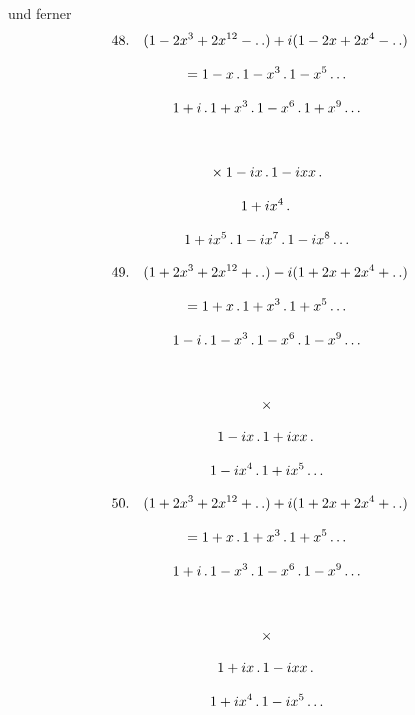 \begingroup
\renewcommand{\arraystretch}{1.45}
\par {}



und ferner
\[
\begin{gathered}
48.\quad{}
(1-2x^3+2x^{12}- .\,. )+i(1-2x+2x^4- .\,. )\\[8pt]
\quad=1-x\,.\,1-x^3\,.\,1-x^5\mathinner{.\,.\,.} \\[8pt]\quad{}1+i\,.\,1+x^3\,.\,1-x^6\,.\,1+x^9\mathinner{.\,.\,.}\\[8pt]
\qquad\\[8pt]\quad{}\times1-ix\,.\,1-ixx\,.\,\\[8pt]\quad{}1+ix^4\,.\,\\[8pt]\quad{}1+ix^5\,.\,1-ix^7\,.\,1-ix^8\mathinner{.\,.\,.}
\end{gathered}
\]

\[
\begin{gathered}
49.\quad{}
(1+2x^3+2x^{12}+ .\,. )-i(1+2x+2x^4+ .\,. )\\[8pt]
\quad=1+x\,.\,1+x^3\,.\,1+x^5\mathinner{.\,.\,.} \\[8pt]\quad{}1-i\,.\,1-x^3\,.\,1-x^6\,.\,1-x^9\mathinner{.\,.\,.}\\[8pt]
\qquad\\[8pt]\quad{}\times\\[8pt]\quad{}1-ix\,.\,1+ixx\,.\,\\[8pt]\quad{}1-ix^4\,.\,1+ix^5\mathinner{.\,.\,.}
\end{gathered}
\]

\[
\begin{gathered}
50.\quad{}
(1+2x^3+2x^{12}+ .\,. )+i(1+2x+2x^4+ .\,. )\\[8pt]
\quad=1+x\,.\,1+x^3\,.\,1+x^5\mathinner{.\,.\,.} \\[8pt]\quad{}1+i\,.\,1-x^3\,.\,1-x^6\,.\,1-x^9\mathinner{.\,.\,.}\\[8pt]
\qquad\\[8pt]\quad{}\times\\[8pt]\quad{}1+ix\,.\,1-ixx\,.\,\\[8pt]\quad{}1+ix^4\,.\,1-ix^5\mathinner{.\,.\,.}
\end{gathered}
\]


